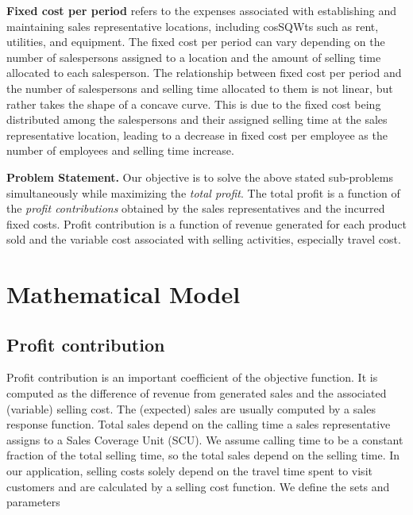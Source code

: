 \documentclass[12pt]{scrartcl}
\begin{document}
\textbf{Fixed cost per period} refers to the expenses associated with establishing and maintaining sales representative locations, including cosSQWts such as rent, utilities, and equipment. The fixed cost per period can vary depending on the number of salespersons assigned to a location and the amount of selling time allocated to each salesperson. The relationship between fixed cost per period and the number of salespersons and selling time allocated to them is not linear, but rather takes the shape of a concave curve. This is due to the fixed cost being distributed among the salespersons and their assigned selling time at the sales representative location, leading to a decrease in fixed cost per employee as the number of employees and selling time increase.

\textbf{Problem Statement.} Our objective is to solve the above stated sub-problems simultaneously while maximizing the \emph{total profit}. The total profit is a function of the \emph{profit contributions} obtained by the sales representatives and the incurred fixed costs. Profit contribution is a function of revenue generated for each product sold and the variable cost associated with selling activities, especially travel cost.



\section{Mathematical Model}

\subsection{Profit contribution}
Profit contribution is an important coefficient of the objective function. It is computed as the difference of revenue from generated sales and the associated (variable) selling cost. The (expected) sales are usually computed by a sales response function. Total sales depend on the calling time a sales representative assigns to a Sales Coverage Unit (SCU). We assume calling time to be a constant fraction of the total selling time, so the total sales depend on the selling time. In our application, selling costs solely depend on the travel time spent to visit customers and are calculated by a selling cost function. We define the sets and parameters
\end{document}

